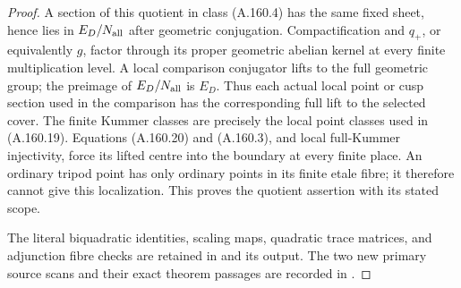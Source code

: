 \begin{proof}
A section of this quotient in class (A.160.4) has the
same fixed sheet, hence lies in \(E_D/N_{\rm all}\)
after geometric conjugation.  Compactification and
\(q_+\), or equivalently \(g\), factor through its
proper geometric abelian kernel at every finite
multiplication level.  A local comparison conjugator
lifts to the full geometric group; the preimage of
\(E_D/N_{\rm all}\) is \(E_D\).  Thus each actual
local point or cusp section used in the comparison
has the corresponding full lift to the selected cover.
The finite Kummer classes are precisely the local
point classes used in (A.160.19).  Equations
(A.160.20) and (A.160.3), and local full-Kummer
injectivity, force its lifted centre into the boundary
at every finite place.  An ordinary tripod point has
only ordinary points in its finite etale fibre; it
therefore cannot give this localization.  This proves
the quotient assertion with its stated scope.

The literal biquadratic identities, scaling maps,
quadratic trace matrices, and adjunction fibre checks
are retained in
and its output.  The two new primary source scans and
their exact theorem passages are recorded in
.
\end{proof}
